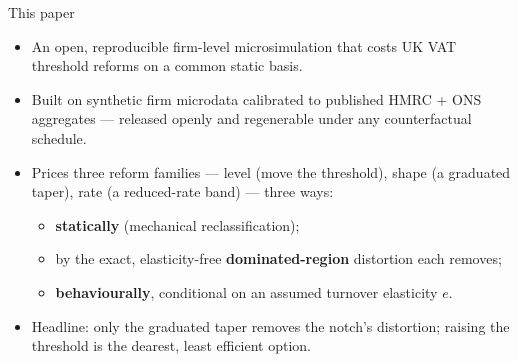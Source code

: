 \documentclass[aspectratio=169]{beamer}
\begin{document}
\begin{frame}{This paper}
  \begin{itemize}\itemsep0.25cm
    \item An \alert{open, reproducible firm-level microsimulation} that costs
      UK VAT threshold reforms on a common static basis.
    \item Built on \alert{synthetic firm microdata} calibrated to published
      HMRC + ONS aggregates --- \alert{released openly} and regenerable under
      any counterfactual schedule.
    \item Prices three reform families --- \alert{level} (move the threshold),
      \alert{shape} (a graduated taper), \alert{rate} (a reduced-rate band) ---
      \alert{three ways}:
      \begin{itemize}\itemsep0.1cm
        \item[1.] \textbf{statically} (mechanical reclassification);
        \item[2.] by the exact, elasticity-free \textbf{dominated-region} distortion each removes;
        \item[3.] \textbf{behaviourally}, conditional on an assumed turnover elasticity $e$.
      \end{itemize}
    \item \alert{Headline:} only the graduated taper removes the notch's
      distortion; raising the threshold is the dearest, least efficient option.
  \end{itemize}
\end{frame}
\end{document}
